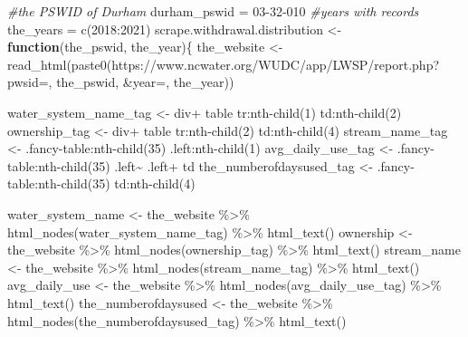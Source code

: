 \documentclass[
  12pt,
]{article}
\newenvironment{Shaded}{\begin{snugshade}}{\end{snugshade}}
\newcommand{\CommentTok}[1]{\textcolor[rgb]{0.56,0.35,0.01}{\textit{#1}}}
\newcommand{\ControlFlowTok}[1]{\textcolor[rgb]{0.13,0.29,0.53}{\textbf{#1}}}
\newcommand{\DecValTok}[1]{\textcolor[rgb]{0.00,0.00,0.81}{#1}}
\newcommand{\FunctionTok}[1]{\textcolor[rgb]{0.00,0.00,0.00}{#1}}
\newcommand{\NormalTok}[1]{#1}
\newcommand{\OtherTok}[1]{\textcolor[rgb]{0.56,0.35,0.01}{#1}}
\newcommand{\SpecialCharTok}[1]{\textcolor[rgb]{0.00,0.00,0.00}{#1}}
\newcommand{\StringTok}[1]{\textcolor[rgb]{0.31,0.60,0.02}{#1}}
\begin{document}
\begin{Shaded}
\begin{Highlighting}[]
\CommentTok{\#the PSWID of Durham}
\NormalTok{durham\_pswid }\OtherTok{=} \StringTok{\textquotesingle{}03{-}32{-}010\textquotesingle{}}
\CommentTok{\#years with records}
\NormalTok{the\_years }\OtherTok{=} \FunctionTok{c}\NormalTok{(}\DecValTok{2018}\SpecialCharTok{:}\DecValTok{2021}\NormalTok{)}
\NormalTok{scrape.withdrawal.distribution }\OtherTok{\textless{}{-}} \ControlFlowTok{function}\NormalTok{(the\_pswid, the\_year)\{}
\NormalTok{  the\_website }\OtherTok{\textless{}{-}} \FunctionTok{read\_html}\NormalTok{(}\FunctionTok{paste0}\NormalTok{(}\StringTok{\textquotesingle{}https://www.ncwater.org/WUDC/app/LWSP/report.php?pwsid=\textquotesingle{}}\NormalTok{, }
\NormalTok{                                  the\_pswid, }\StringTok{\textquotesingle{}\&year=\textquotesingle{}}\NormalTok{, the\_year))}
  
\NormalTok{  water\_system\_name\_tag }\OtherTok{\textless{}{-}} \StringTok{\textquotesingle{}div+ table tr:nth{-}child(1) td:nth{-}child(2)\textquotesingle{}}
\NormalTok{  ownership\_tag }\OtherTok{\textless{}{-}} \StringTok{\textquotesingle{}div+ table tr:nth{-}child(2) td:nth{-}child(4)\textquotesingle{}}
\NormalTok{  stream\_name\_tag }\OtherTok{\textless{}{-}} \StringTok{\textquotesingle{}.fancy{-}table:nth{-}child(35) .left:nth{-}child(1)\textquotesingle{}}
\NormalTok{  avg\_daily\_use\_tag }\OtherTok{\textless{}{-}} \StringTok{\textquotesingle{}.fancy{-}table:nth{-}child(35) .left\textasciitilde{} .left+ td\textquotesingle{}}
\NormalTok{  the\_numberofdaysused\_tag }\OtherTok{\textless{}{-}} \StringTok{\textquotesingle{}.fancy{-}table:nth{-}child(35) td:nth{-}child(4)\textquotesingle{}}
  
\NormalTok{  water\_system\_name }\OtherTok{\textless{}{-}}\NormalTok{ the\_website }\SpecialCharTok{\%\textgreater{}\%} \FunctionTok{html\_nodes}\NormalTok{(water\_system\_name\_tag) }\SpecialCharTok{\%\textgreater{}\%} \FunctionTok{html\_text}\NormalTok{()}
\NormalTok{  ownership }\OtherTok{\textless{}{-}}\NormalTok{ the\_website }\SpecialCharTok{\%\textgreater{}\%}   \FunctionTok{html\_nodes}\NormalTok{(ownership\_tag) }\SpecialCharTok{\%\textgreater{}\%}  \FunctionTok{html\_text}\NormalTok{()}
\NormalTok{  stream\_name }\OtherTok{\textless{}{-}}\NormalTok{ the\_website }\SpecialCharTok{\%\textgreater{}\%} \FunctionTok{html\_nodes}\NormalTok{(stream\_name\_tag) }\SpecialCharTok{\%\textgreater{}\%} \FunctionTok{html\_text}\NormalTok{()}
\NormalTok{  avg\_daily\_use }\OtherTok{\textless{}{-}}\NormalTok{ the\_website }\SpecialCharTok{\%\textgreater{}\%} \FunctionTok{html\_nodes}\NormalTok{(avg\_daily\_use\_tag) }\SpecialCharTok{\%\textgreater{}\%} \FunctionTok{html\_text}\NormalTok{()}
\NormalTok{  the\_numberofdaysused }\OtherTok{\textless{}{-}}\NormalTok{ the\_website }\SpecialCharTok{\%\textgreater{}\%} \FunctionTok{html\_nodes}\NormalTok{(the\_numberofdaysused\_tag) }\SpecialCharTok{\%\textgreater{}\%} \FunctionTok{html\_text}\NormalTok{()}
  

\end{Highlighting}
\end{Shaded}
\end{document}
